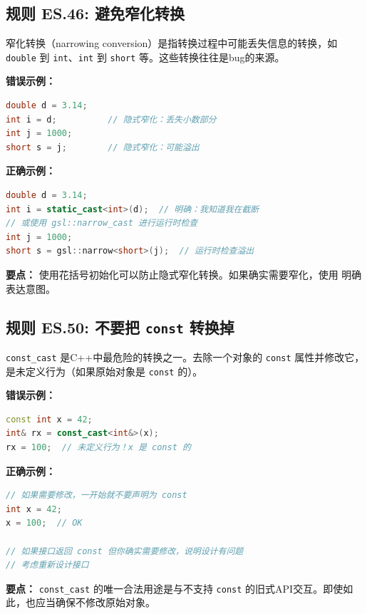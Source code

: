 \subsection*{\textbf{规则 ES.46:} 避免窄化转换}

窄化转换（narrowing conversion）是指转换过程中可能丢失信息的转换，如 \texttt{double} 到 \texttt{int}、\texttt{int} 到 \texttt{short} 等。这些转换往往是bug的来源。

\textbf{错误示例：}

\begin{lstlisting}[language=C++]
double d = 3.14;
int i = d;          // 隐式窄化：丢失小数部分
int j = 1000;
short s = j;        // 隐式窄化：可能溢出
\end{lstlisting}

\textbf{正确示例：}

\begin{lstlisting}[language=C++]
double d = 3.14;
int i = static_cast<int>(d);  // 明确：我知道我在截断
// 或使用 gsl::narrow_cast 进行运行时检查
int j = 1000;
short s = gsl::narrow<short>(j);  // 运行时检查溢出
\end{lstlisting}

\textbf{要点：} 使用花括号初始化可以防止隐式窄化转换。如果确实需要窄化，使用 \texttt{} 明确表达意图。

\subsection*{\textbf{规则 ES.50:} 不要把 \texttt{const} 转换掉}

\texttt{const\_cast} 是C++中最危险的转换之一。去除一个对象的 \texttt{const} 属性并修改它，是未定义行为（如果原始对象是 \texttt{const} 的）。

\textbf{错误示例：}

\begin{lstlisting}[language=C++]
const int x = 42;
int& rx = const_cast<int&>(x);
rx = 100;  // 未定义行为！x 是 const 的
\end{lstlisting}

\textbf{正确示例：}

\begin{lstlisting}[language=C++]
// 如果需要修改，一开始就不要声明为 const
int x = 42;
x = 100;  // OK

// 如果接口返回 const 但你确实需要修改，说明设计有问题
// 考虑重新设计接口
\end{lstlisting}

\textbf{要点：} \texttt{const\_cast} 的唯一合法用途是与不支持 \texttt{const} 的旧式API交互。即使如此，也应当确保不修改原始对象。

